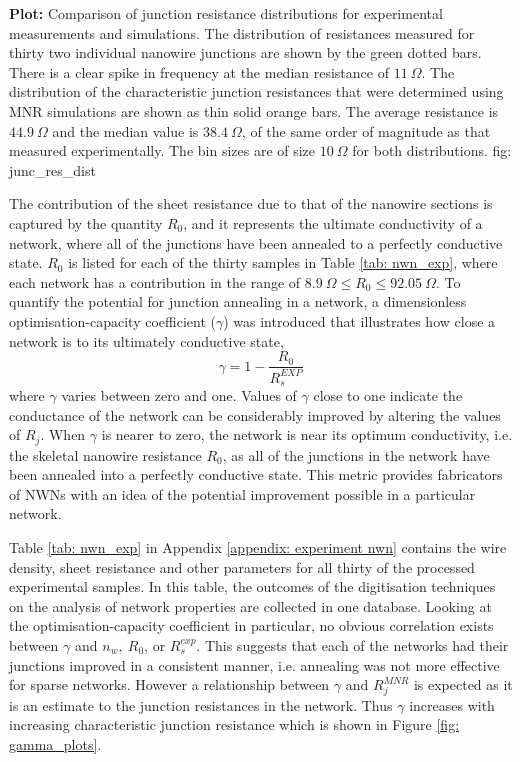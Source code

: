 {\textbf{Plot:} Comparison of junction resistance distributions for experimental measurements and simulations.}
{The distribution of resistances measured for thirty two individual nanowire junctions are shown by the green dotted bars\cite{bellew2015}. There is a clear spike in frequency at the median resistance of $11 ~ \Omega$. The distribution of the characteristic junction resistances that were determined using MNR simulations are shown as thin solid orange bars. The average resistance is $44.9 ~\Omega$ and the median value is $38.4~\Omega$, of the same order of magnitude as that measured experimentally. The bin sizes are of size $10~ \Omega$ for both distributions.}
{fig: junc_res_dist}

The contribution of the sheet resistance due to that of the nanowire sections is captured by the quantity $R_0$, and it represents the ultimate conductivity of a network, where all of the junctions have been annealed to a perfectly conductive state. $R_0$ is listed for each of the thirty samples in Table \ref{tab: nwn_exp}, where each network has a contribution in the range of $8.9~\Omega \leq R_0 \leq 92.05~\Omega$. To quantify the potential for junction annealing in a network, a dimensionless optimisation-capacity coefficient ($\gamma$) was introduced \cite{rocha2015} that illustrates how close a network is to its ultimately conductive state,
\begin{equation}
\gamma = 1 - \frac{R_0}{R_s^{EXP}}
\end{equation}
where $\gamma$ varies between zero and one. Values of $\gamma$ close to one indicate the conductance of the network can be considerably improved by altering the values of $R_j$. When $\gamma$ is nearer to zero, the network is near its optimum conductivity, i.e. the skeletal nanowire resistance $R_0$, as all of the junctions in the network have been annealed into a perfectly conductive state. This metric provides fabricators of NWNs with an idea of the potential improvement possible in a particular network. 

Table \ref{tab: nwn_exp} in Appendix \ref{appendix: experiment nwn} contains the wire density, sheet resistance and other parameters for all thirty of the processed experimental samples. In this table, the outcomes of the digitisation techniques on the analysis of network properties are collected in one database. Looking at the optimisation-capacity coefficient in particular, no obvious correlation exists between $\gamma$ and $n_w, ~ R_0$, or $R_s^{exp}$. This suggests that each of the networks had their junctions improved in a consistent manner, i.e. annealing was not more effective for sparse networks. However a relationship between $\gamma$ and $R_j^{MNR}$ is expected as it is an estimate to the junction resistances in the network. Thus $\gamma$ increases with increasing characteristic junction resistance which is shown in Figure \ref{fig: gamma_plots}.

